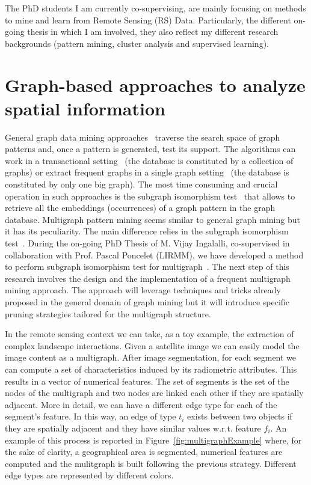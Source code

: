 The PhD students I am currently co-supervising, are mainly focusing on methods to mine and learn from Remote Sensing (RS) Data. Particularly, the different on-going thesis in which I am involved, they also reflect my different research backgrounds (pattern mining,  cluster analysis and supervised learning).



\section{Graph-based approaches to analyze spatial information}
\label{multigraph-mining}


General graph data mining approaches~\cite{YanH02,KuramochiK05,ElseidyASK14} traverse the search space of graph patterns and, once a pattern is generated, test its support. The algorithms can work in a transactional setting~\cite{YanH02} (the database is constituted by a collection of graphs) or extract frequent graphs in a single graph setting~\cite{KuramochiK05,ElseidyASK14} (the database is constituted by only one big graph). The most time consuming and crucial operation in such approaches is the subgraph isomorphism test~\cite{BonniciGPSF13} that allows to retrieve all the embeddings (occurrences) of a graph pattern in the graph database. 
Multigraph pattern mining seems similar to general graph mining but it has its peculiarity. The main difference relies in the subgraph isomorphism test~\cite{Ingalalli15}.
During the on-going PhD Thesis of M. Vijay Ingalalli, co-supervised in collaboration with Prof. Pascal Poncelet (LIRMM), we have developed a method to perform subgraph isomorphism test for multigraph~\cite{Ingalalli15}. The next step of this research involves the design and the implementation of a frequent multigraph mining approach. The approach will leverage techniques and tricks already proposed in the general domain of graph mining but it will introduce specific pruning strategies tailored for the multigraph structure.

In the remote sensing context we can take, as a toy example, the extraction of complex landscape interactions. Given a satellite image we can easily model the image content as a multigraph. After image segmentation, for each segment we can compute a set of characteristics induced by its radiometric attributes. This results in a vector of numerical features. The set of segments is the set of the nodes of the multigraph and two nodes are linked each other if they are spatially adjacent. More in detail, we can have a different edge type for each of the segment's feature. In this way, an edge of type $t_i$ exists between two objects if they are spatially adjacent and they have similar values w.r.t. feature $f_i$. An example of this process is reported in Figure~\ref{fig:multigraphExample} where, for the sake of clarity, a geographical area is segmented, numerical features are computed and the mulitgraph is built following the previous strategy. Different edge types are represented by different colors.

